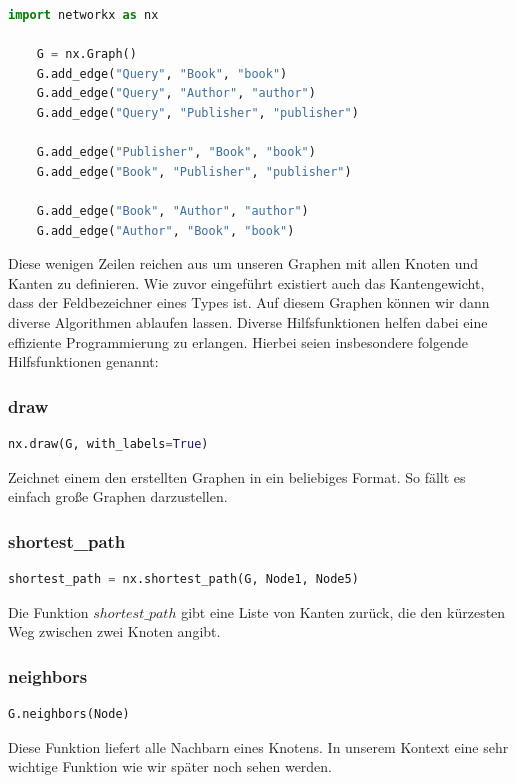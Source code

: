 \begin{lstlisting}[language=Python]
    import networkx as nx

    G = nx.Graph()
    G.add_edge("Query", "Book", "book")
    G.add_edge("Query", "Author", "author")
    G.add_edge("Query", "Publisher", "publisher")

    G.add_edge("Publisher", "Book", "book")
    G.add_edge("Book", "Publisher", "publisher")

    G.add_edge("Book", "Author", "author")
    G.add_edge("Author", "Book", "book")
\end{lstlisting}

Diese wenigen Zeilen reichen aus um unseren Graphen mit allen Knoten und Kanten zu definieren.
Wie zuvor eingeführt existiert auch das Kantengewicht, dass der Feldbezeichner eines Types ist.
Auf diesem Graphen können wir dann diverse Algorithmen ablaufen lassen.
Diverse Hilfsfunktionen helfen dabei eine effiziente Programmierung zu erlangen.
Hierbei seien insbesondere folgende Hilfsfunktionen genannt:

\subsubsection{draw}
    \begin{lstlisting}[language=Python]
        nx.draw(G, with_labels=True)
    \end{lstlisting}

Zeichnet einem den erstellten Graphen in ein beliebiges Format.
So fällt es einfach große Graphen darzustellen.

\subsubsection{shortest\_path}
    \begin{lstlisting}[language=Python]
        shortest_path = nx.shortest_path(G, Node1, Node5)
    \end{lstlisting}

Die Funktion $shortest\_path$ gibt eine Liste von Kanten zurück, die den kürzesten Weg zwischen zwei
Knoten angibt.

\subsubsection{neighbors}
    \begin{lstlisting}[language=Python]
        G.neighbors(Node)
    \end{lstlisting}
Diese Funktion liefert alle Nachbarn eines Knotens.
In unserem Kontext eine sehr wichtige Funktion wie wir später noch sehen werden.

